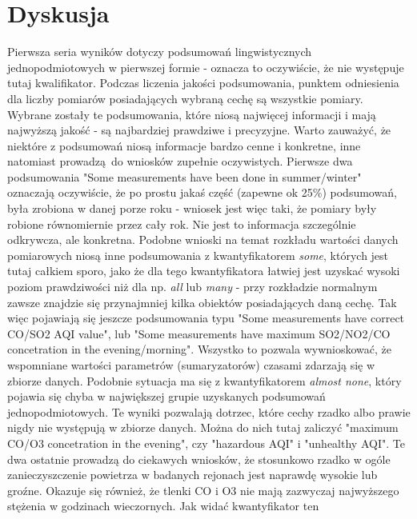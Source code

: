 \documentclass{classrep}
\begin{document}
    \section{Dyskusja} {
        Pierwsza seria wyników dotyczy podsumowań lingwistycznych jednopodmiotowych w pierwszej
        formie - oznacza to oczywiście, że nie występuje tutaj kwalifikator. Podczas liczenia
        jakości podsumowania, punktem odniesienia dla liczby pomiarów posiadających wybraną cechę są
        wszystkie pomiary. Wybrane zostały te podsumowania, które niosą najwięcej informacji i mają
        najwyższą jakość - są najbardziej prawdziwe i precyzyjne. Warto zauważyć, że niektóre z
        podsumowań niosą informacje bardzo cenne i konkretne, inne natomiast prowadzą do wniosków
        zupełnie oczywistych. Pierwsze dwa podsumowania "Some measurements have been done in
        summer/winter" oznaczają oczywiście, że po prostu jakaś część (zapewne ok 25\%) podsumowań,
        była zrobiona w danej porze roku - wniosek jest więc taki, że pomiary były robione
        równomiernie przez cały rok. Nie jest to informacja szczególnie odkrywcza, ale konkretna.
        Podobne wnioski na temat rozkładu wartości danych pomiarowych niosą inne podsumowania z
        kwantyfikatorem \emph{some}, których jest tutaj całkiem sporo, jako że dla tego
        kwantyfikatora łatwiej jest uzyskać wysoki poziom prawdziwości niż dla np. \emph{all} lub
        \emph{many} - przy rozkładzie normalnym zawsze znajdzie się przynajmniej kilka obiektów
        posiadających daną cechę. Tak więc pojawiają się jeszcze podsumowania typu "Some
        measurements have correct CO/SO2 AQI value", lub "Some measurements have maximum SO2/NO2/CO
        concetration in the evening/morning". Wszystko to pozwala wywnioskować, że wspomniane
        wartości parametrów (sumaryzatorów) czasami zdarzają się w zbiorze danych. Podobnie sytuacja
        ma się z kwantyfikatorem \emph{almost none}, który pojawia się chyba w największej grupie
        uzyskanych podsumowań jednopodmiotowych. Te wyniki pozwalają dotrzec, które cechy rzadko
        albo prawie nigdy nie występują w zbiorze danych. Można do nich tutaj zaliczyć "maximum
        CO/O3 concetration in the evening", czy "hazardous AQI" i "unhealthy AQI". Te dwa ostatnie
        prowadzą do ciekawych wniosków, że stosunkowo rzadko w ogóle zanieczyszczenie powietrza w
        badanych rejonach jest naprawdę wysokie lub groźne. Okazuje się również, że tlenki CO i O3
        nie mają zazwyczaj najwyższego stężenia w godzinach wieczornych. Jak widać kwantyfikator ten
}
\end{document}
